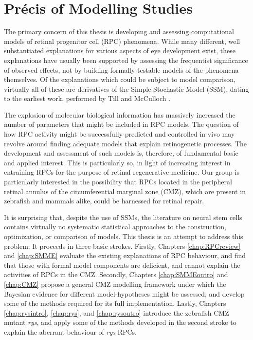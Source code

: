 \section*{Pr\'{e}cis of Modelling Studies}
\label{ch:precis}

The primary concern of this thesis is developing and assessing computational models of retinal progenitor cell (RPC) phenomena. While many different, well substantiated explanations for various aspects of eye development exist, these explanations have usually been supported by assessing the frequentist significance of observed effects, not by building formally testable models of the phenomena themselves. Of the explanations which could be subject to model comparison, virtually all of these are derivatives of the Simple Stochastic Model (SSM), dating to the earliest work, performed by Till and McCulloch \cite{Till1964}.

The explosion of molecular biological information has massively increased the number of parameters that might be included in RPC models. The question of how RPC activity might be successfully predicted and controlled in vivo may revolve around finding adequate models that explain retinogenetic processes. The development and assessment of such models is, therefore, of fundamental basic and applied interest. This is particularly so, in light of increasing interest in entraining RPCs for the purpose of retinal regenerative medicine. Our group is particularly interested in the possibility that RPCs located in the peripheral retinal annulus of the circumferential marginal zone (CMZ), which are present in zebrafish and mammals alike, could be harnessed for retinal repair.

It is surprising that, despite the use of SSMs, the literature on neural stem cells contains virtually no systematic statistical approaches to the construction, optimization, or comparison of models. This thesis is an attempt to address this problem. It proceeds in three basic strokes. Firstly, Chapters \ref{chap:RPCreview} and \ref{chap:SMME} evaluate the existing explanations of RPC behaviour, and find that those with formal model components are deficient, and cannot explain the activities of RPCs in the CMZ. Secondly, Chapters \ref{chap:SMMEoutro} and \ref{chap:CMZ} propose a general CMZ modelling framework under which the Bayesian evidence for different model-hypotheses might be assessed, and develop some of the methods required for its full implementation. Lastly, Chapters \ref{chap:rysintro}, \ref{chap:rys}, and \ref{chap:rysoutro} introduce the zebrafish CMZ mutant \textit{rys}, and apply some of the methods developed in the second stroke to explain the aberrant behaviour of \textit{rys} RPCs. 

